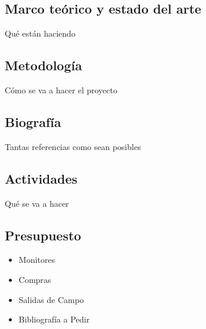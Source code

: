\subsection{Marco teórico y estado del arte}
	Qué están haciendo 


\subsection{Metodología}
	Cómo se va a hacer el proyecto


\subsection{Biografía}
	Tantas referencias como sean posibles


\subsection{Actividades}
	Qué se va a hacer

\subsection{Presupuesto}
	\begin{itemize}
		\item Monitores
		\item Compras
		\item Salidas de Campo
		\item Bibliografía a Pedir
	\end{itemize}
